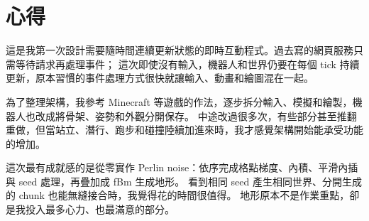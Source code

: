 \section{心得}

這是我第一次設計需要隨時間連續更新狀態的即時互動程式。過去寫的網頁服務只需等待請求再處理事件；
這次即使沒有輸入，機器人和世界仍要在每個 tick 持續更新，原本習慣的事件處理方式很快就讓輸入、動畫和繪圖混在一起。

為了整理架構，我參考 Minecraft 等遊戲的作法，逐步拆分輸入、模擬和繪製，機器人也改成將骨架、姿勢和外觀分開保存。
中途改過很多次，有些部分甚至推翻重做，但當站立、潛行、跑步和碰撞陸續加進來時，我才感覺架構開始能承受功能的增加。

這次最有成就感的是從零實作 Perlin noise：依序完成格點梯度、內積、平滑內插與 seed 處理，再疊加成 fBm 生成地形。
看到相同 seed 產生相同世界、分開生成的 chunk 也能無縫接合時，我覺得花的時間很值得。
地形原本不是作業重點，卻是我投入最多心力、也最滿意的部分。
